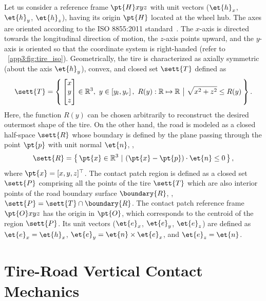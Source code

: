 Let us consider a reference frame $\pt{H}xyz$ with unit vectors ($\et{h}_x$, $\et{h}_y$, $\et{h}_z$),  having its origin $\pt{H}$ located at the wheel hub. The axes are oriented according to the ISO 8855:2011 standard~\cite{iso88552011}. The $x$-axis is directed towards the longitudinal direction of motion, the $z$-axis points upward, and the $y$-axis is oriented so that the coordinate system is right-handed (refer to \figurename~\ref{app3:fig:tire_iso}).  Geometrically, the tire is characterized as axially symmetric (about the axis $\et{h}_y$), convex, and closed set $\sett{T}$ defined as
%
\begin{equation}
  \sett{T} = \left\{ \, \begin{bmatrix} x\\ y\\ z \end{bmatrix} \in \mathbb{R}^3, ~ y \in \left[ y_l, y_r \right], ~ R(y):\mathbb{R} \mapsto \mathbb{R} ~\big|~ \sqrt{x^2+z^2} \leq R(y) \, \right\}.
\end{equation}
%
Here, the function $R(y)$ can be chosen arbitrarily to reconstruct the desired outermost shape of the tire. On the other hand, the road is modeled as a closed half-space $\sett{R}$ whose boundary is defined by the plane passing through the point $\pt{p}$ with unit normal $\et{n}$, \ie{},
%
\begin{equation}
  \sett{R} = \left\{ \, \pt{x}\in\mathbb{R}^3 ~|~ (\pt{x}-\pt{p})\cdot\et{n} \leq 0 \, \right\},
\end{equation}
%
where $\pt{x} = [x,y,z]^\top$. The contact patch region is defined as a closed set $\sett{P}$ comprising all the points of the tire $\sett{T}$ which are also interior points of the road boundary surface $\boundary{R}$, \ie{}, $\sett{P} = \sett{T} \cap \boundary{R}$. The contact patch reference frame $\pt{O}xyz$ has the origin in $\pt{O}$, which corresponds to the centroid of the region $\sett{P}$. Its unit vectors ($\et{e}_x$, $\et{e}_y$, $\et{e}_z$) are defined as $\et{e}_x = \et{h}_x$, $\et{e}_y = \et{n} \times \et{e}_x$, and $\et{e}_z = \et{n}$.


\section{Tire-Road Vertical Contact Mechanics}
\label{app3:sec:vertical_contact}

